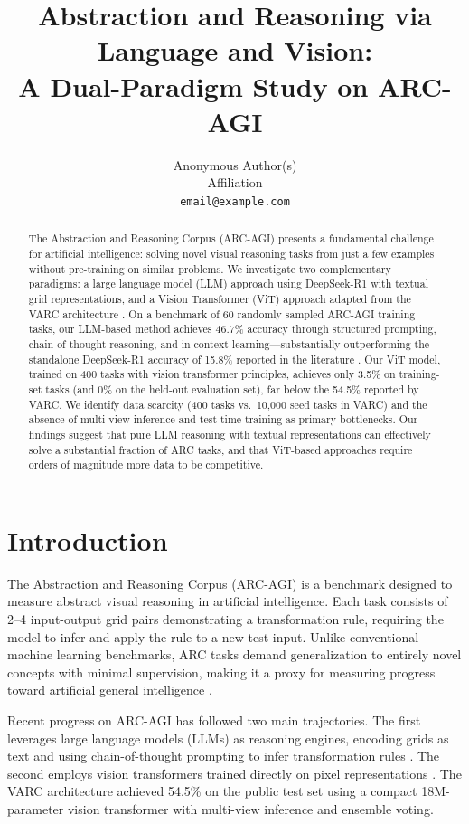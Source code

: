 \documentclass{article}
\title{Abstraction and Reasoning via Language and Vision: \\ A Dual-Paradigm Study on ARC-AGI}
\author{Anonymous Author(s) \\
  Affiliation \\
  \texttt{email@example.com}
}
\begin{document}
\maketitle

\begin{abstract}
The Abstraction and Reasoning Corpus (ARC-AGI) presents a fundamental challenge for artificial intelligence: solving novel visual reasoning tasks from just a few examples without pre-training on similar problems. We investigate two complementary paradigms: a large language model (LLM) approach using DeepSeek-R1 with textual grid representations, and a Vision Transformer (ViT) approach adapted from the VARC architecture \cite{arxiv2511.14761}. On a benchmark of 60 randomly sampled ARC-AGI training tasks, our LLM-based method achieves 46.7\% accuracy through structured prompting, chain-of-thought reasoning, and in-context learning---substantially outperforming the standalone DeepSeek-R1 accuracy of 15.8\% reported in the literature \cite{deepseek2025r1}. Our ViT model, trained on 400 tasks with vision transformer principles, achieves only 3.5\% on training-set tasks (and 0\% on the held-out evaluation set), far below the 54.5\% reported by VARC. We identify data scarcity (400 tasks vs.~10,000 seed tasks in VARC) and the absence of multi-view inference and test-time training as primary bottlenecks. Our findings suggest that pure LLM reasoning with textual representations can effectively solve a substantial fraction of ARC tasks, and that ViT-based approaches require orders of magnitude more data to be competitive.
\end{abstract}

\section{Introduction}

The Abstraction and Reasoning Corpus (ARC-AGI) \cite{chollet2019measure,chollet2024arc} is a benchmark designed to measure abstract visual reasoning in artificial intelligence. Each task consists of 2--4 input-output grid pairs demonstrating a transformation rule, requiring the model to infer and apply the rule to a new test input. Unlike conventional machine learning benchmarks, ARC tasks demand generalization to entirely novel concepts with minimal supervision, making it a proxy for measuring progress toward artificial general intelligence \cite{chollet2019measure}.

Recent progress on ARC-AGI has followed two main trajectories. The first leverages large language models (LLMs) as reasoning engines, encoding grids as text and using chain-of-thought prompting \cite{wei2022chain} to infer transformation rules \cite{bermansonnet2024,bermanpython2025,bermancomefirst2024,li2025combining}. The second employs vision transformers trained directly on pixel representations \cite{li2024tackling,arxiv2511.14761}. The VARC architecture \cite{arxiv2511.14761} achieved 54.5\% on the public test set using a compact 18M-parameter vision transformer with multi-view inference and ensemble voting.
\end{document}
